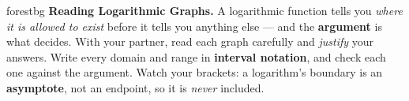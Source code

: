 \documentclass[10pt]{article}
\begin{document}
\namepartnerperiod

\vspace{0.08in}

\begin{headlinebox}{forestbg}
\small\textbf{Reading Logarithmic Graphs.} A logarithmic function tells you \emph{where it is allowed
to exist} before it tells you anything else --- and the \textbf{argument} is what decides. With your
partner, read each graph carefully and \emph{justify} your answers. Write every domain and range in
\textbf{interval notation}, and check each one against the argument. Watch your brackets: a
logarithm's boundary is an \textbf{asymptote}, not an endpoint, so it is \emph{never} included.
\end{headlinebox}

\vspace{0.06in}
\end{document}
